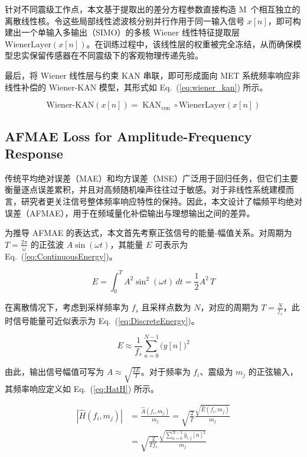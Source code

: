 \documentclass[sn-nature]{sn-jnl}
\newcommand{\magn}{m} %
\newcommand{\fidx}{i} %
\newcommand{\midx}{j} %
\newcommand{\mmax}{M} %
\newcommand{\pidx}{n} %
\newcommand{\pmax}{N} %
\newcommand{\pred}[1]{\hat{#1}} %
\begin{document}
针对不同震级工作点，本文基于提取出的差分方程参数直接构造 \mmax~个相互独立的离散线性核。令这些局部线性滤波核分别并行作用于同一输入信号 $x[n]$，即可构建出一个单输入多输出（SIMO）的多核 Wiener 线性特征提取层 $\mathrm{WienerLayer}(x[n])$。在训练过程中，该线性层的权重被完全冻结，从而确保模型忠实保留传感器在不同震级下的客观物理传递先验。

最后，将 Wiener 线性层与约束 KAN 串联，即可形成面向 MET 系统频率响应非线性补偿的 Wiener-KAN 模型，其形式如 Eq.~(\ref{eq:wiener_kan}) 所示。

\begin{equation}
    \text{Wiener-KAN}(x[n]) = \operatorname{KAN}_{\text{con}} \circ \mathrm{WienerLayer}(x[n])
    \label{eq:wiener_kan}
\end{equation}


\subsection{AFMAE Loss for Amplitude-Frequency Response}

传统平均绝对误差（MAE）和均方误差（MSE）广泛用于回归任务，但它们主要衡量逐点误差累积，并且对高频随机噪声往往过于敏感。对于非线性系统建模而言，研究者更关注信号整体频率响应特性的保持。因此，本文设计了幅频平均绝对误差（AFMAE），用于在频域量化补偿输出与理想输出之间的差异。

为推导 AFMAE 的表达式，本文首先考察正弦信号的能量-幅值关系。对周期为 $T = \frac{2\pi}{\omega}$ 的正弦波 $A\sin(\omega t)$，其能量 $E$ 可表示为 Eq.~(\ref{eq:ContinuousEnergy})。

\begin{equation}
    E = \int_{0}^{T} A^2 \sin^2(\omega t) \, dt = \frac{1}{2} A^2 \, T
    \label{eq:ContinuousEnergy}
\end{equation}

在离散情况下，考虑到采样频率为 $f_s$ 且采样点数为 $\pmax$，对应的周期为 $T = \frac{N}{f_s}$，此时信号能量可近似表示为 Eq.~(\ref{eq:DiscreteEnergy})。

\begin{equation}
    E \approx \frac{1}{f_s} \sum_{\pidx=0}^{\pmax-1} \bigl(y[n]\bigr)^2
    \label{eq:DiscreteEnergy}
\end{equation}

由此，输出信号幅值可写为 $A \approx \sqrt{\frac{2E}{T}}$。对于频率为 $f_\fidx$、震级为 $\magn_\midx$ 的正弦输入，其频率响应定义如 Eq.~(\ref{eq:HatH}) 所示。

\begin{equation}
    \begin{aligned}
        \left|\pred{H}(f_\fidx,\magn_\midx)\right|
         & = \frac{\pred{A}(f_\fidx,\magn_\midx)}{\magn_\midx}
        = \sqrt{\frac{2}{T}} \frac{\sqrt{\hat{E}(f_\fidx,\magn_\midx)}}{\magn_\midx} \\
         & = \sqrt{\frac{2}{T f_s}}
        \frac{\sqrt{\sum_{\pidx=0}^{\pmax-1} \hat{y}_{\fidx,\midx}[n]^2}}{\magn_\midx}
    \end{aligned}
    \label{eq:HatH}
\end{equation}
\end{document}
